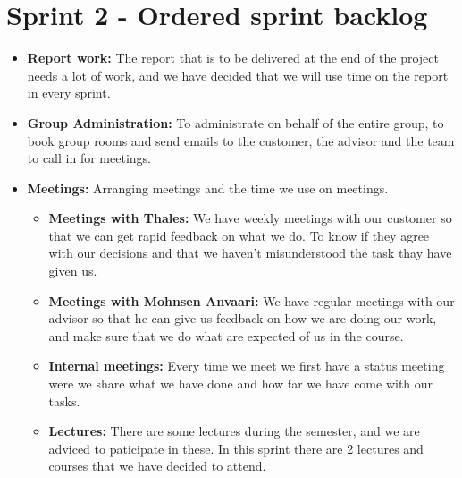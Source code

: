 \section{Sprint 2 - Ordered sprint backlog}

\begin{itemize}
\item{}\textbf{Report work:} The report that is to be delivered at the end of the project needs a lot of work, and we have decided that we will use time on the report in every sprint.
\item{}\textbf{Group Administration:} To administrate on behalf of the entire group, to book group rooms and send emails to the customer, the advisor and the team to call in for meetings.
\item{}\textbf{Meetings:} Arranging meetings and the time we use on meetings.
\begin{itemize}
\item{}\textbf{Meetings with Thales:} We have weekly meetings with our customer so that we can get rapid feedback on what we do. To know if they agree with our decisions and that we haven't misunderstood the task thay have given us.
\item{}\textbf{Meetings with Mohnsen Anvaari:} We have regular meetings with our advisor so that he can give us feedback on how we are doing our work, and make sure that we do what are expected of us in the course.
\item{}\textbf{Internal meetings:} Every time we meet we first have a status meeting were we share what we have done and how far we have come with our tasks.
\item{}\textbf{Lectures:} There are some lectures during the semester, and we are adviced to paticipate in these. In this sprint there are 2 lectures and courses that we have decided to attend.
\end{itemize}

\newpage


\end{itemize}
